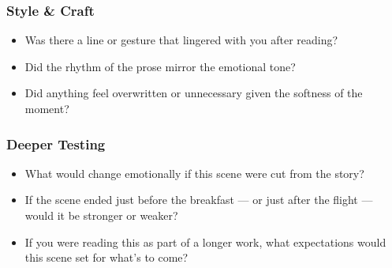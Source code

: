 \subsubsection*{Style \& Craft}

\begin{itemize}
  \item Was there a line or gesture that lingered with you after reading?
  \item Did the rhythm of the prose mirror the emotional tone?
  \item Did anything feel overwritten or unnecessary given the softness of the moment?
\end{itemize}

\subsubsection*{Deeper Testing}

\begin{itemize}
  \item What would change emotionally if this scene were cut from the story?
  \item If the scene ended just before the breakfast — or just after the flight — would it be stronger or weaker?
  \item If you were reading this as part of a longer work, what expectations would this scene set for what’s to come?
\end{itemize}










